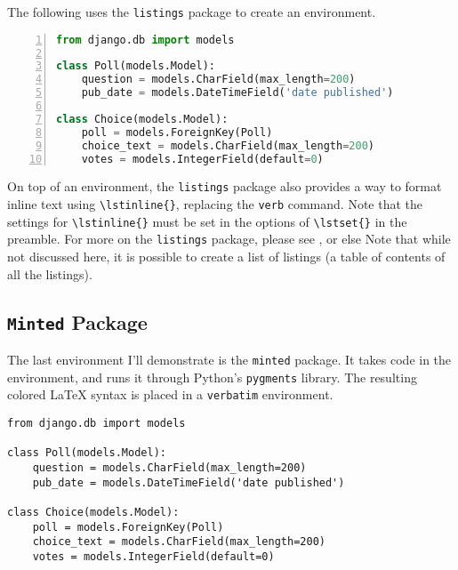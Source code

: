 The following uses the \verb|listings| package to create an environment.

\noindent\minipage{\linewidth} %
\begin{lstlisting}[aboveskip=\baselineskip,%
                   basicstyle=\ttfamily,%
                   belowskip=\baselineskip,%
                   caption={\lstinline{models.py} from Django Tutorial using Listings},%
                   columns=fixed,%
                   firstnumber=1,%
                   frame=single,%
                   label=code:django:models_basic_listing,%
                   language=Python,%
                   numbers=left,%
                   showstringspaces=false,%
                   showspaces=false]
from django.db import models

class Poll(models.Model):
    question = models.CharField(max_length=200)
    pub_date = models.DateTimeField('date published')

class Choice(models.Model):
    poll = models.ForeignKey(Poll)
    choice_text = models.CharField(max_length=200)
    votes = models.IntegerField(default=0)
\end{lstlisting}
\endminipage %

On top of an environment, the \lstinline{listings} package also provides a way to format inline text using \lstinline|\lstinline{}|, replacing the \lstinline{verb} command. Note that the settings for \lstinline|\lstinline{}| must be set in the options of \lstinline|\lstset{}| in the preamble. For more on the \lstinline{listings} package, please see , or else 
Note that while not discussed here, it is possible to create a list of listings (a table of contents of all the listings).

\subsection{\texttt{Minted} Package}

The last environment I'll demonstrate is the \verb|minted| package. It takes code in the environment, and runs it through Python's \verb|pygments| library. The resulting colored \LaTeX{} syntax is placed in a \verb|verbatim| environment.

\begin{verbatim}
from django.db import models

class Poll(models.Model):
    question = models.CharField(max_length=200)
    pub_date = models.DateTimeField('date published')

class Choice(models.Model):
    poll = models.ForeignKey(Poll)
    choice_text = models.CharField(max_length=200)
    votes = models.IntegerField(default=0)
\end{verbatim}

